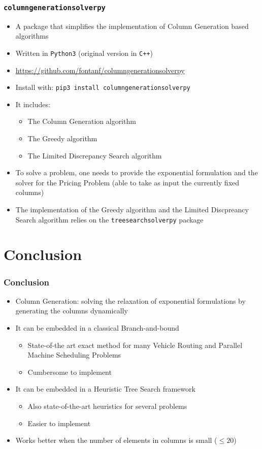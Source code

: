 \documentclass[10pt]{beamer}
\begin{document}
\begin{frame}
  \frametitle{\texttt{columngenerationsolverpy}}

  \begin{itemize}
    \item A package that simplifies the implementation of Column Generation based algorithms
    \item Written in \texttt{Python3} (original version in \texttt{C++})
    \item \url{https://github.com/fontanf/columngenerationsolverpy}
    \item Install with: \texttt{pip3 install columngenerationsolverpy}
    \item It includes:
      \begin{itemize}
        \item The Column Generation algorithm
        \item The Greedy algorithm
        \item The Limited Discrepancy Search algorithm
      \end{itemize}
    \item To solve a problem, one needs to provide the exponential formulation and the solver for the Pricing Problem (able to take as input the currently fixed columns)
    \item The implementation of the Greedy algorithm and the Limited Discpreancy Search algorithm relies on the \texttt{treesearchsolverpy} package
  \end{itemize}
\end{frame}

\section{Conclusion}

\begin{frame}
  \frametitle{Conclusion}

  \begin{itemize}
    \item Column Generation: solving the relaxation of exponential formulations by generating the columns dynamically
    \item It can be embedded in a classical Branch-and-bound
      \begin{itemize}
        \item State-of-the art exact method for many Vehicle Routing and Parallel Machine Scheduling Problems
        \item Cumbersome to implement
      \end{itemize}
    \item It can be embedded in a Heuristic Tree Search framework
      \begin{itemize}
        \item Also state-of-the-art heuristics for several problems
        \item Easier to implement
      \end{itemize}
    \item Works better when the number of elements in columns is small ($\le 20$)
  \end{itemize}
\end{frame}

\maketitle
\end{document}
